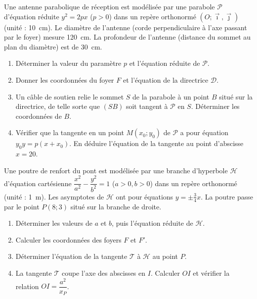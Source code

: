 \documentclass[11pt]{article}
\begin{document}
\begin{exercice}
Une antenne parabolique de réception est modélisée par une parabole $\mathcal{P}$ d'équation réduite $y^2 = 2px$ ($p>0$) dans un repère orthonormé $(O;\vec{\imath},\vec{\jmath})$ (unité : \SI{10}{cm}). Le diamètre de l'antenne (corde perpendiculaire à l'axe passant par le foyer) mesure \SI{120}{cm}. La profondeur de l'antenne (distance du sommet au plan du diamètre) est de \SI{30}{cm}.
\begin{enumerate}
    \item Déterminer la valeur du paramètre $p$ et l'équation réduite de $\mathcal{P}$.
    \item Donner les coordonnées du foyer $F$ et l'équation de la directrice $\mathcal{D}$.
    \item Un câble de soutien relie le sommet $S$ de la parabole à un point $B$ situé sur la directrice, de telle sorte que $(SB)$ soit tangent à $\mathcal{P}$ en $S$. Déterminer les coordonnées de $B$.
    \item Vérifier que la tangente en un point $M(x_0;y_0)$ de $\mathcal{P}$ a pour équation $y_0y = p(x+x_0)$. En déduire l'équation de la tangente au point d'abscisse $x=20$.
\end{enumerate}
\end{exercice}

\begin{exercice}
Une poutre de renfort du pont est modélisée par une branche d'hyperbole $\mathcal{H}$ d'équation cartésienne $\dfrac{x^2}{a^2} - \dfrac{y^2}{b^2} = 1$ ($a>0, b>0$) dans un repère orthonormé (unité : \SI{1}{m}). Les asymptotes de $\mathcal{H}$ ont pour équations $y = \pm \frac{3}{4}x$. La poutre passe par le point $P(8; 3)$ situé sur la branche de droite.
\begin{enumerate}
    \item Déterminer les valeurs de $a$ et $b$, puis l'équation réduite de $\mathcal{H}$.
    \item Calculer les coordonnées des foyers $F$ et $F'$.
    \item Déterminer l'équation de la tangente $\mathcal{T}$ à $\mathcal{H}$ au point $P$.
    \item La tangente $\mathcal{T}$ coupe l'axe des abscisses en $I$. Calculer $OI$ et vérifier la relation $OI = \dfrac{a^2}{x_P}$.
\end{enumerate}
\end{exercice}
\end{document}
